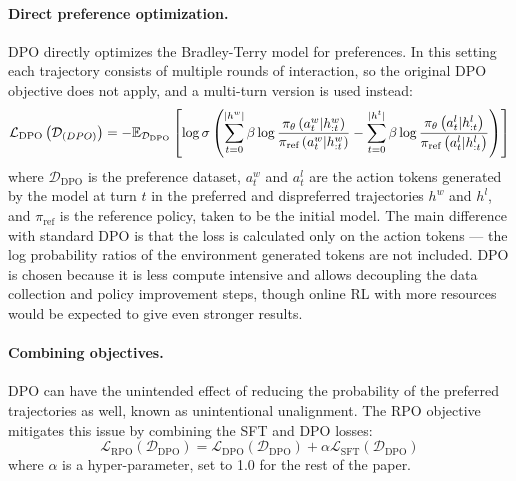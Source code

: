\documentclass[manuscript,review]{acmart}
\begin{document}
{{\paragraph{Direct preference optimization.}{
DPO\cite{rafailov2024direct} directly optimizes the Bradley-Terry
model\cite{bradley1952rank} for preferences. In this setting each trajectory consists of
multiple rounds of interaction, so the original DPO objective does not apply, and a
multi-turn version\cite{rafailov2024rqlanguagemodel} is used instead:
\begin{equation}
    \mathcal{L}_{\text{DPO}}\left( \mathcal{D}_{\text(DPO)} \right) = -\mathbb{E}_{ \mathcal{D}_{\text{DPO}} } \left[ \log \sigma \left( \sum_{t = 0}^{|h^w|} \beta \log{\dfrac{\pi_{\theta} \left( a_{t}^{w} | h_{:t}^{w} \right)}{\pi_{\text{ref}} \left( a_{t}^{w} | h_{:t}^{w} \right)}} - \sum_{t=0}^{|h^t|} \beta \log{ \dfrac{ \pi_{\theta} \left( a_{t}^{l} | h_{:t}^{l} \right) }{ \pi_{\text{ref}} \left( a_{t}^{l} | h_{:t}^{l} \right) } } \right) \right]
\end{equation}
where $\mathcal{D}_\text{DPO}$ is the preference dataset, $a_t^w$ and $a_t^l$ are the
action tokens generated by the model at turn $t$ in the preferred and dispreferred
trajectories $h^w$ and $h^l$, and $\pi_\text{ref}$ is the reference policy, taken to be
the initial model. The main difference with standard DPO is that the loss is calculated
only on the action tokens --- the log probability ratios of the environment generated
tokens are not included. DPO is chosen because it is less compute intensive and allows
decoupling the data collection and policy improvement steps, though online RL with more
resources would be expected to give even stronger results.
}

\paragraph{Combining objectives.}{
DPO can have the unintended effect of reducing the probability of the preferred
trajectories as well, known as unintentional
unalignment\cite{razin2024unintentionalunalignmentlikelihooddisplacement}. The RPO
objective\cite{pang2024iterativereasoningpreferenceoptimization} mitigates this issue by
combining the SFT and DPO losses:
\begin{equation}
    \label{eq:rpo}
    \mathcal{L}_{\text{RPO}}(\mathcal{D}_\text{DPO}) = \mathcal{L}_\text{DPO}(\mathcal{D}_\text{DPO}) + \alpha \mathcal{L}_\text{SFT}(\mathcal{D}_\text{DPO})
\end{equation}
where $\alpha$ is a hyper-parameter, set to 1.0 for the rest of the paper.
}
}

}
\end{document}
